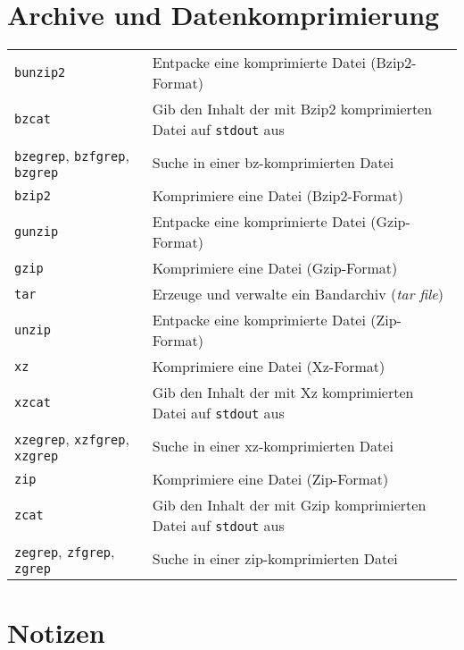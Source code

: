 \documentclass[10pt,a4paper]{article}
\begin{document}
\begin{multicols}{2}
\section{Archive und Datenkomprimierung}
\begin{tabular}{ p{2.5cm} p{8.5cm} }
  \hline 
  \texttt{bunzip2} & Entpacke eine komprimierte Datei (Bzip2-Format) \\
  \rowcolor{Gray}
  \texttt{bzcat} & Gib den Inhalt der mit Bzip2 kompri\-mierten Datei auf \texttt{stdout} aus\\
  \texttt{bzegrep}, \texttt{bzfgrep}, \texttt{bzgrep} & Suche in einer bz-komprimierten Datei \\
  \rowcolor{Gray}
  \texttt{bzip2} & Komprimiere eine Datei (Bzip2-Format) \\
  \texttt{gunzip} & Entpacke eine komprimierte Datei (Gzip-Format) \\
  \rowcolor{Gray}
  \texttt{gzip} & Komprimiere eine Datei (Gzip-Format) \\
  \texttt{tar} & Erzeuge und verwalte ein Bandarchiv (\textit{tar file}) \\
  \rowcolor{Gray}
  \texttt{unzip} & Entpacke eine komprimierte Datei (Zip-Format) \\
  \texttt{xz} & Komprimiere eine Datei (Xz-Format) \\
  \rowcolor{Gray}
  \texttt{xzcat} & Gib den Inhalt der mit Xz komprimierten Datei auf \texttt{stdout} aus \\
  \texttt{xzegrep}, \texttt{xzfgrep}, \texttt{xzgrep} & Suche in einer xz-komprimierten Datei \\
  \rowcolor{Gray}
  \texttt{zip} & Komprimiere eine Datei (Zip-Format) \\
  \texttt{zcat} & Gib den Inhalt der mit Gzip kompri\-mierten Datei auf \texttt{stdout} aus \\
  \rowcolor{Gray}
  \texttt{zegrep}, \texttt{zfgrep}, \texttt{zgrep} & Suche in einer zip-komprimierten Datei \\
  \hline
\end{tabular}


\columnbreak

\section*{Notizen\phantom{g}}


\end{multicols}
\end{document}

